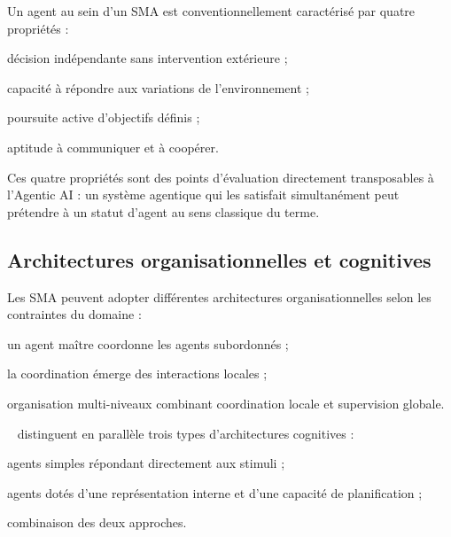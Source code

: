 Un agent au sein d'un SMA est conventionnellement caractérisé par quatre propriétés \cite{sma_systemes,sma_general_survey} :

\begin{description}[leftmargin=1.4cm,style=nextline]
\item[Autonomie] décision indépendante sans intervention extérieure ;
\item[Réactivité] capacité à répondre aux variations de l'environnement ;
\item[Proactivité] poursuite active d'objectifs définis ;
\item[Sociabilité] aptitude à communiquer et à coopérer.
\end{description}

Ces quatre propriétés sont des points d'évaluation directement transposables à l'Agentic AI : un système agentique qui les satisfait simultanément peut prétendre à un statut d'agent au sens classique du terme.

\subsection{Architectures organisationnelles et cognitives}

Les SMA peuvent adopter différentes architectures organisationnelles selon les contraintes du domaine \cite{dorri2018mas} :

\begin{description}[leftmargin=1.4cm,style=nextline]
\item[Centralisée] un agent maître coordonne les agents subordonnés ;
\item[Décentralisée] la coordination émerge des interactions locales ;
\item[Hiérarchique] organisation multi-niveaux combinant coordination locale et supervision globale.
\end{description}

\citeauthor{sma_systemes}~\cite{sma_systemes} distinguent en parallèle trois types d'architectures cognitives :

\begin{description}[leftmargin=1.4cm,style=nextline]
\item[Réactifs] agents simples répondant directement aux stimuli ;
\item[Cognitifs] agents dotés d'une représentation interne et d'une capacité de planification ;
\item[Hybrides] combinaison des deux approches.
\end{description}

